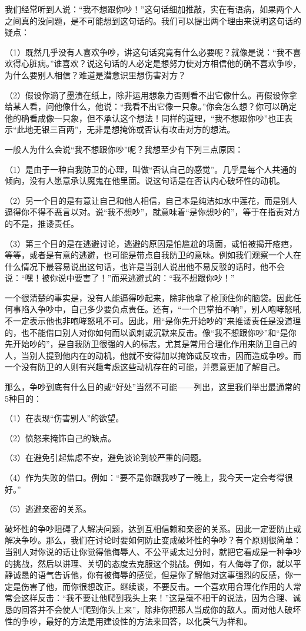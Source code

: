 \documentclass[12pt,UTF8]{ctexbook}
\begin{document}
我们经常听到人说：“我不想跟你吵！”这句话细加推敲，实在有语病，如果两个人之间真的没问题，是不可能想到这句话的。我们可以提出两个理由来说明这句话的疑点：

（1）既然几乎没有人喜欢争吵，讲这句话究竟有什么必要呢？就像是说：“我不喜欢得心脏病。”谁喜欢？说这句话的人必定是想努力使对方相信他的确不喜欢争吵，为什么要别人相信？难道是潜意识里想伤害对方？

（2）假设你滴了墨渍在纸上，除非运用想象力否则看不出它像什么。再假设你拿给某人看，问他像什么，他说：“我看不出它像一只象。”你会怎么想？你可以确定他的确看成像一只象，但不承认这个想法！同样的道理，“我不想跟你吵”也正表示“此地无银三百两”，无非是想掩饰或否认有攻击对方的想法。

一般人为什么会说“我不想跟你吵”呢？我想至少有下列三点原因：

（1）是由于一种自我防卫的心理，叫做“否认自己的感觉”。几乎是每个人共通的倾向，没有人愿意承认魔鬼在他里面。说这句话是在否认内心破坏性的动机。

（2）另一个目的是有意让自己和他人相信，自己本是纯洁如水中莲花，而是别人逼得你不得不恶言以对。说“我不想吵”，就意味着“是你想吵的”，等于在指责对方的不是，推诿责任。

（3）第三个目的是在逃避讨论，逃避的原因是怕尴尬的场面，或怕被揭开疮疤，等等，或者是有意的逃避，也可能是带点自我防卫的意味。例如我们观察一个人在什么情况下最容易说出这句话，也许是当别人说出他不易反驳的话时，他不会说：“嘿！被你说中要害了！”而采逃避式的：“我不想跟你吵！”

一个很清楚的事实是，没有人能逼得吵起来，除非他拿了枪顶住你的脑袋。因此任何事陷入争吵中，自己多少要负点责任。还有，“一个巴掌拍不响”，别人咆哮怒吼不一定表示他也非咆哮怒吼不可。因此，用“是你先开始吵的”来推诿责任是没道理的，也不能借口别人对你如何而以讽刺或沉默来反击。像“我不想跟你吵”和“是你先开始吵的”，是自我防卫很强的人的标志，尤其是常用合理化作用来防卫自己的人，当别人提到他内在的动机，他就不安得加以掩饰或反攻击，因而造成争吵。而一个没有防卫的人则有兴趣考虑这些动机存在的可能，并愿意更加了解自己。

那么，争吵到底有什么目的或“好处”当然不可能——列出，这里我们举出最通常的5种目的：

（1）在表现“伤害别人”的欲望。

（2）愤怒来掩饰自己的缺点。

（3）在避免引起焦虑不安，避免谈论到较严重的问题。

（4）作为失败的借口。例如：“要不是你跟我吵了一晚上，我今天一定会考得很好。”

（5）逃避亲密的关系。

破坏性的争吵阻碍了人解决问题，达到互相信赖和亲密的关系。因此一定要防止或解决争吵。那么，我们在讨论时要如何防止变成破坏性的争吵？有个原则很简单：当别人对你说的话让你觉得他侮辱人、不公平或太过分时，就把它看成是一种争吵的挑战，然后以讲理、关切的态度去克服这个挑战。例如，有人侮辱了你，就以平静诚恳的语气告诉他，你有被侮辱的感觉，但是你了解他对这事强烈的反感，你一定是伤害了他，而你很想改正。继续谈，不要反击。一个喜欢用合理化作用的人常常会这样反击：“我不要让他爬到我头上来！”这是毫不相干的说法，因为合理、诚恳的回答并不会使人“爬到你头上来”，除非你把那人当成你的敌人。面对他人破坏性的争吵，最好的方法是用建设性的方法来回答，以化戾气为祥和。
\end{document}
